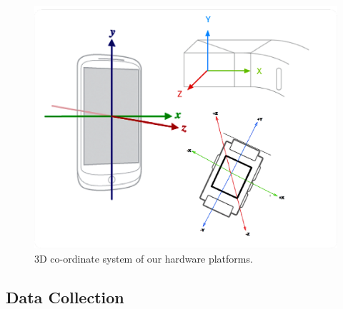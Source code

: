 \begin{figure}
  \centering
  \includegraphics[width=0.9\columnwidth]{figures/coordinates.png}
  \caption{3D co-ordinate system of our hardware platforms.}
  \label{fig:coordinate}
\end{figure}

\subsection{Data Collection}
\label{sec:data-collection-2}









